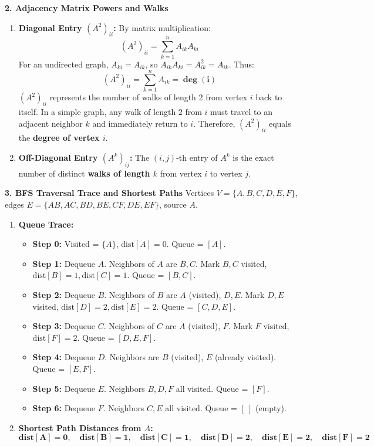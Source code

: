 \textbf{2. Adjacency Matrix Powers and Walks}
\begin{enumerate}
    \item \textbf{Diagonal Entry $(A^2)_{ii}$:}
    By matrix multiplication:
    \begin{equation*}
    (A^2)_{ii} = \sum_{k=1}^n A_{ik} A_{ki}
    \end{equation*}
    For an undirected graph, $A_{ki} = A_{ik}$, so $A_{ik} A_{ki} = A_{ik}^2 = A_{ik}$. Thus:
    \begin{equation*}
    (A^2)_{ii} = \sum_{k=1}^n A_{ik} = \mathbf{\deg(i)}
    \end{equation*}
    $(A^2)_{ii}$ represents the number of walks of length 2 from vertex $i$ back to itself. In a simple graph, any walk of length 2 from $i$ must travel to an adjacent neighbor $k$ and immediately return to $i$. Therefore, $(A^2)_{ii}$ equals the \textbf{degree of vertex $i$}.
    \item \textbf{Off-Diagonal Entry $(A^k)_{ij}$:}
    The $(i, j)$-th entry of $A^k$ is the exact number of distinct \textbf{walks of length $k$} from vertex $i$ to vertex $j$.
\end{enumerate}

\textbf{3. BFS Traversal Trace and Shortest Paths}
Vertices $V = \{A, B, C, D, E, F\}$, edges $E = \{AB, AC, BD, BE, CF, DE, EF\}$, source $A$.
\begin{enumerate}
    \item \textbf{Queue Trace:}
    \begin{itemize}
        \item \textbf{Step 0:} Visited = $\{A\}$, $\text{dist}[A] = 0$. Queue = $[A]$.
        \item \textbf{Step 1:} Dequeue $A$. Neighbors of $A$ are $B, C$. Mark $B, C$ visited, $\text{dist}[B] = 1, \text{dist}[C] = 1$. Queue = $[B, C]$.
        \item \textbf{Step 2:} Dequeue $B$. Neighbors of $B$ are $A$ (visited), $D, E$. Mark $D, E$ visited, $\text{dist}[D] = 2, \text{dist}[E] = 2$. Queue = $[C, D, E]$.
        \item \textbf{Step 3:} Dequeue $C$. Neighbors of $C$ are $A$ (visited), $F$. Mark $F$ visited, $\text{dist}[F] = 2$. Queue = $[D, E, F]$.
        \item \textbf{Step 4:} Dequeue $D$. Neighbors are $B$ (visited), $E$ (already visited). Queue = $[E, F]$.
        \item \textbf{Step 5:} Dequeue $E$. Neighbors $B, D, F$ all visited. Queue = $[F]$.
        \item \textbf{Step 6:} Dequeue $F$. Neighbors $C, E$ all visited. Queue = $[\ ]$ (empty).
    \end{itemize}
    \item \textbf{Shortest Path Distances from $A$:}
    \begin{equation*}
    \mathbf{\text{dist}[A] = 0, \quad \text{dist}[B] = 1, \quad \text{dist}[C] = 1, \quad \text{dist}[D] = 2, \quad \text{dist}[E] = 2, \quad \text{dist}[F] = 2}
    \end{equation*}
\end{enumerate}

